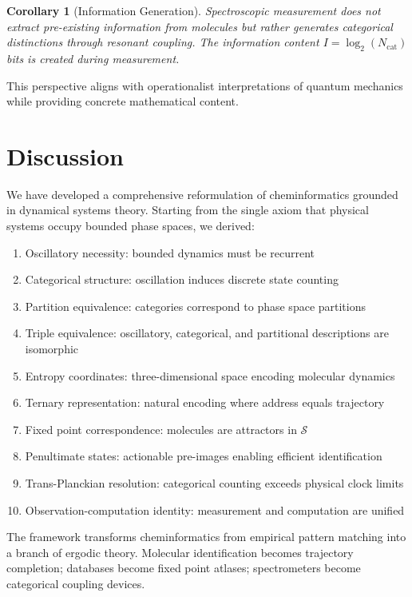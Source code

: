 \documentclass[twocolumn,10pt,a4paper]{article}
\newtheorem{corollary}[theorem]{Corollary}
\newcommand{\Sspace}{\mathcal{S}}
\begin{document}
\begin{corollary}[Information Generation]
Spectroscopic measurement does not extract pre-existing information from molecules but rather \emph{generates} categorical distinctions through resonant coupling. The information content $I = \log_2(N_{\text{cat}})$ bits is created during measurement.
\end{corollary}

This perspective aligns with operationalist interpretations of quantum mechanics \citep{bridgman1927logic} while providing concrete mathematical content.

\section{Discussion}

We have developed a comprehensive reformulation of cheminformatics grounded in dynamical systems theory. Starting from the single axiom that physical systems occupy bounded phase spaces, we derived:

\begin{enumerate}
    \item Oscillatory necessity: bounded dynamics must be recurrent
    \item Categorical structure: oscillation induces discrete state counting
    \item Partition equivalence: categories correspond to phase space partitions
    \item Triple equivalence: oscillatory, categorical, and partitional descriptions are isomorphic
    \item Entropy coordinates: three-dimensional space encoding molecular dynamics
    \item Ternary representation: natural encoding where address equals trajectory
    \item Fixed point correspondence: molecules are attractors in $\Sspace$
    \item Penultimate states: actionable pre-images enabling efficient identification
    \item Trans-Planckian resolution: categorical counting exceeds physical clock limits
    \item Observation-computation identity: measurement and computation are unified
\end{enumerate}

The framework transforms cheminformatics from empirical pattern matching into a branch of ergodic theory. Molecular identification becomes trajectory completion; databases become fixed point atlases; spectrometers become categorical coupling devices.
\end{document}
